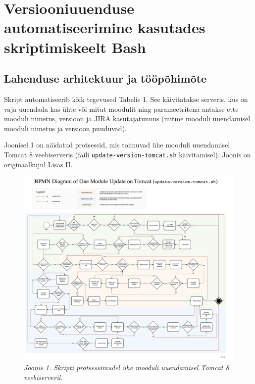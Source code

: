 \documentclass[12pt]{article}
\newcommand{\code}[1]{\texttt{#1}}
\begin{document}
  \newpage
  
  \section{Versiooniuuenduse automatiseerimine kasutades skriptimiskeelt Bash}
  
  \subsection{Lahenduse arhitektuur ja tööpõhimõte}
  
  Skript automatiseerib kõik tegevused Tabelis 1. See käivitatakse serveris, kus on vaja uuendada kas ühte või mitut moodulit ning parameetritena antakse ette mooduli nimetus, versioon ja JIRA kasutajatunnus (mitme mooduli uuendamisel mooduli nimetus ja versioon puuduvad).
  
  Joonisel 1 on näidatud protsessid, mis toimuvad ühe mooduli uuendamisel Tomcat 8 veebiserveris (faili \code{update-version-tomcat.sh} käivitamisel). Joonis on originaalkujul Lisas II.
   
   \begin{figure}[H]
     \begin{center}
       \includegraphics[width=.8\textwidth]{diagrams/BPMN-diagram-one-module-tomcat.png}
       \caption*{\textit{Joonis 1. Skripti protsessimudel ühe mooduli uuendamisel Tomcat 8 veebiserveril.}}
     \end{center}
   \end{figure}
   
   \newpage
   
\end{document}
